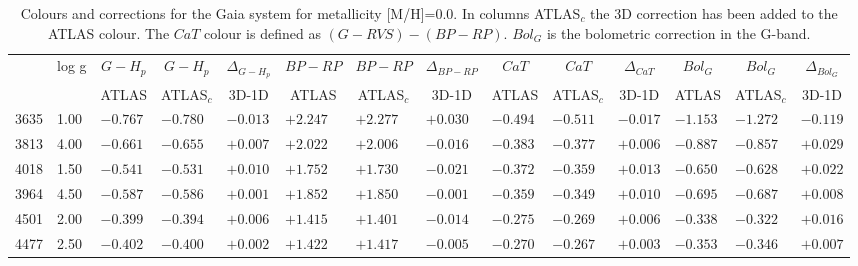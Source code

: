 \documentclass[]{aa}
\def\teff{$T\rm_{eff}$}
\begin{document}
\begin{appendix}
\begin{table*}
\caption{\label{Gaiam00}
Colours and corrections for the Gaia system for metallicity [M/H]=0.0. In columns ATLAS$_c$ the 3D correction
has been added to the ATLAS colour. The $CaT$ colour is defined as $(G-RVS)-(BP-RP)$. $Bol_G$ is the bolometric
correction in the G-band. }
\renewcommand{\tabcolsep}{3pt}
\tabskip=0pt
\begin{center}
\begin{tabular}{llllllllllllll}
\hline\noalign{\smallskip}
\multicolumn{1}{c}{\teff} & 
\multicolumn{1}{c}{log g} & 
\multicolumn{1}{c}{$G-H_p$} &
\multicolumn{1}{c}{$G-H_p$} &
\multicolumn{1}{c}{$\Delta_{G-H_p}$} &
\multicolumn{1}{c}{$BP-RP$} &
\multicolumn{1}{c}{$BP-RP$} &
\multicolumn{1}{c}{$\Delta_{BP-RP}$} &
\multicolumn{1}{c}{$CaT$} &
\multicolumn{1}{c}{$CaT$} &
\multicolumn{1}{c}{$\Delta_{CaT}$} & 
\multicolumn{1}{c}{$Bol_G$} &
\multicolumn{1}{c}{$Bol_G$} &
\multicolumn{1}{c}{$\Delta_{Bol_G}$} \\
\multicolumn{2}{c}{ } &  
\multicolumn{1}{c}{ATLAS} &
\multicolumn{1}{c}{ATLAS$_c$}&
\multicolumn{1}{c}{3D-1D}&
\multicolumn{1}{c}{ATLAS} &
\multicolumn{1}{c}{ATLAS$_c$}&
\multicolumn{1}{c}{3D-1D}&
\multicolumn{1}{c}{ATLAS} &
\multicolumn{1}{c}{ATLAS$_c$}&
\multicolumn{1}{c}{3D-1D}&
\multicolumn{1}{c}{ATLAS} &
\multicolumn{1}{c}{ATLAS$_c$}&
\multicolumn{1}{c}{3D-1D} \\
\hline\noalign{\smallskip}
\hline\noalign{\smallskip}
3635  &1.00 & $-0.767$ &$ -0.780$ &$ -0.013$ &$ +2.247$ &$ +2.277$ &$ +0.030$ &$ -0.494$ &$ -0.511$  &$-0.017$ &$ -1.153$ &$ -1.272$&$  -0.119$ \\
3813  &4.00 & $-0.661$ &$ -0.655$ &$ +0.007$ &$ +2.022$ &$ +2.006$ &$ -0.016$ &$ -0.383$ &$ -0.377$  &$+0.006$ &$ -0.887$ &$ -0.857$&$  +0.029$ \\
4018  &1.50 & $-0.541$ &$ -0.531$ &$ +0.010$ &$ +1.752$ &$ +1.730$ &$ -0.021$ &$ -0.372$ &$ -0.359$  &$+0.013$ &$ -0.650$ &$ -0.628$&$  +0.022$ \\
3964  &4.50 & $-0.587$ &$ -0.586$ &$ +0.001$ &$ +1.852$ &$ +1.850$ &$ -0.001$ &$ -0.359$ &$ -0.349$  &$+0.010$ &$ -0.695$ &$ -0.687$&$  +0.008$ \\
4501  &2.00 & $-0.399$ &$ -0.394$ &$ +0.006$ &$ +1.415$ &$ +1.401$ &$ -0.014$ &$ -0.275$ &$ -0.269$  &$+0.006$ &$ -0.338$ &$ -0.322$&$  +0.016$ \\
4477  &2.50 & $-0.402$ &$ -0.400$ &$ +0.002$ &$ +1.422$ &$ +1.417$ &$ -0.005$ &$ -0.270$ &$ -0.267$  &$+0.003$ &$ -0.353$ &$ -0.346$&$  +0.007$ \\

\end{tabular}
\end{center}
\end{table*}
\end{appendix}
\end{document}
